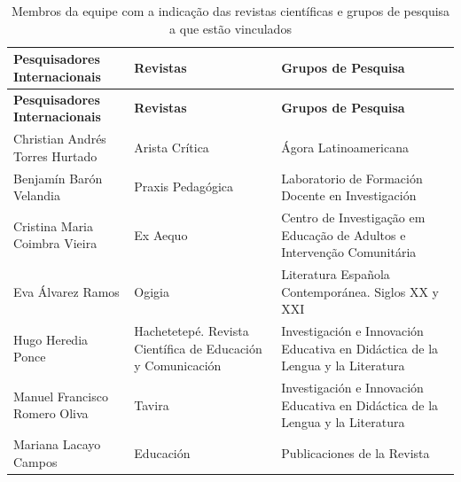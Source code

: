 \documentclass[
  a4paper,
]{book}
\begin{document}
\begin{longtable}[]{@{}
  >{\raggedright\arraybackslash}p{}
  >{\raggedright\arraybackslash}p{}
  >{\raggedright\arraybackslash}p{}@{}}
\caption{Membros da equipe com a indicação das revistas científicas e
grupos de pesquisa a que estão vinculados}\label{tbl-2}\tabularnewline
\toprule\noalign{}
\begin{minipage}[b]{\linewidth}\raggedright
\textbf{Pesquisadores Internacionais}
\end{minipage} & \begin{minipage}[b]{\linewidth}\raggedright
\textbf{Revistas}
\end{minipage} & \begin{minipage}[b]{\linewidth}\raggedright
\textbf{Grupos de Pesquisa}
\end{minipage} \\
\midrule\noalign{}
\endfirsthead
\toprule\noalign{}
\begin{minipage}[b]{\linewidth}\raggedright
\textbf{Pesquisadores Internacionais}
\end{minipage} & \begin{minipage}[b]{\linewidth}\raggedright
\textbf{Revistas}
\end{minipage} & \begin{minipage}[b]{\linewidth}\raggedright
\textbf{Grupos de Pesquisa}
\end{minipage} \\
\midrule\noalign{}
\endhead
\bottomrule\noalign{}
\endlastfoot
Christian Andrés Torres Hurtado & Arista Crítica & Ágora
Latinoamericana \\
Benjamín Barón Velandia & Praxis Pedagógica & Laboratorio de Formación
Docente en Investigación \\
Cristina Maria Coimbra Vieira & Ex Aequo & Centro de Investigação em
Educação de Adultos e Intervenção Comunitária \\
Eva Álvarez Ramos & Ogigia & Literatura Española Contemporánea. Siglos
XX y XXI \\
Hugo Heredia Ponce & Hachetetepé. Revista Científica de Educación y
Comunicación & Investigación e Innovación Educativa en Didáctica de la
Lengua y la Literatura \\
Manuel Francisco Romero Oliva & Tavira & Investigación e Innovación
Educativa en Didáctica de la Lengua y la Literatura \\
Mariana Lacayo Campos & Educación & Publicaciones de la Revista

\end{longtable}
\end{document}
